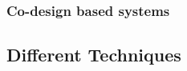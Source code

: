 \subsubsection{Co-design based systems}
\label{sec:codesign}





\subsection{Different Techniques}
\label{sec:technique}




